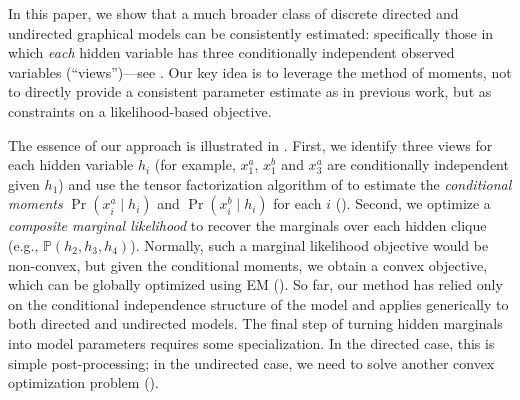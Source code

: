 In this paper,
we show that a much broader class of discrete directed and undirected graphical models can be consistently estimated:
specifically those in which \emph{each} hidden variable has three conditionally
independent observed variables (``views'')---see .
Our key idea is to leverage the method of moments,
not to directly provide a consistent parameter estimate as in previous work,
but as constraints on a likelihood-based objective.


The essence of our approach is illustrated in . 
First, we identify three views for each hidden variable $h_i$ (for example,
$x_1^a$, $x_1^b$ and $x_3^a$ are conditionally independent given $h_1$) and use
the tensor factorization algorithm of
\citet{anandkumar13tensor} to estimate the \emph{conditional
moments} $\Pr(x_i^a \mid h_i)$ and $\Pr(x_i^b \mid h_i)$ for each $i$ ().
Second, we optimize a \emph{composite marginal likelihood} to recover the marginals over
each hidden clique (e.g., $\mathbb P(h_2, h_3, h_4)$).
Normally, such a marginal likelihood objective would be non-convex,
but given the conditional moments, we obtain a convex objective,
which can be globally optimized using EM ().
So far, our method has relied only on the conditional independence
structure of the model and applies generically to both directed
and undirected models.
The final step of turning hidden marginals into model parameters
requires some specialization.
In the directed case, this is simple post-processing;
in the undirected case, we need to solve another convex optimization problem ().

